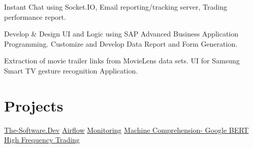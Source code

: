 \documentclass[]{Vishnu-Resume}
\begin{document}
\begin{minipage}[t]{0.66\textwidth}
\begin{tightemize}
\item Instant Chat using Socket.IO, Email reporting/tracking server, Trading performance report.
\end{tightemize}
\sectionsep

\begin{tightemize}
\item Develop \& Design UI and Logic using SAP Advanced Business Application
Programming. Customize and Develop Data Report and Form Generation.
\end{tightemize}
\sectionsep

\begin{tightemize}
\item Extraction of movie trailer links from MovieLens data sets. UI for Samsung Smart TV gesture recognition Application.
\end{tightemize}
\sectionsep


\section{Projects}
\textbullet{} \href{https://github.com/zxingz/WebApp}{The-Software.Dev} \textbullet{} \href{https://github.com/zxingz/Workflow}{Airflow} \textbullet{} \href{https://github.com/zxingz/Monitoring}{Monitoring} \textbullet{} \href{https://github.com/zxingz/machine_comprehension}{Machine Comprehension- Google BERT}  \textbullet{} \href{https://github.com/zxingz/trader}{High Frequency Trading}

\end{minipage} 
\end{document}
